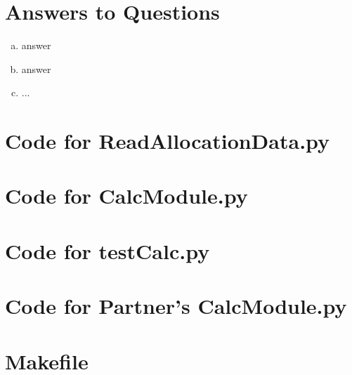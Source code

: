 \documentclass[12pt]{article}
\begin{document}

\section{Answers to Questions}

\begin{enumerate}[(a)]

\item answer

\item answer

\item ...

\end{enumerate}

\newpage

\lstset{language=Python, basicstyle=\tiny, breaklines=true, showspaces=false,
  showstringspaces=false, breakatwhitespace=true}

\def\thesection{\Alph{section}}

\section{Code for ReadAllocationData.py}

\noindent 

\newpage

\section{Code for CalcModule.py}

\noindent 

\newpage

\section{Code for testCalc.py}

\noindent 

\newpage

\section{Code for Partner's CalcModule.py}

\noindent 

\newpage

\section{Makefile}

\lstset{language=make}
\noindent 
\end{document}
